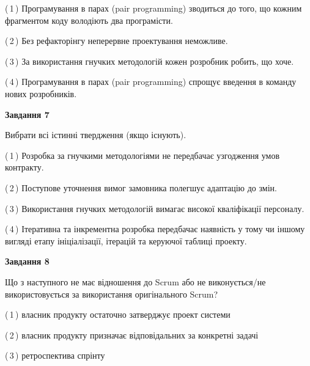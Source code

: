 \documentclass[10pt, ukrainian]{article}
\begin{document}
{\begin {large}
(\,1\,) Програмування в парах (pair programming) зводиться до того, що кожним фрагментом коду володіють два програмісти. %



(\,2\,) Без рефакторінгу неперервне проектування неможливе. %



(\,3\,) За використання гнучких методологій кожен розробник робить, що хоче. %



(\,4\,) Програмування в парах (pair programming) спрощує введення в команду нових розробників. %


{\begin {center}\textbf{Завдання 7}\end {center}}\par
Вибрати всі істинні твердження (якщо існують).\par
\vspace{2mm}



(\,1\,) Розробка за гнучкими методологіями не передбачає узгодження умов контракту. %



(\,2\,) Поступове уточнення вимог замовника полегшує адаптацію до змін. %



(\,3\,) Використання гнучких методологій вимагає високої кваліфікації персоналу. %



(\,4\,) Ітеративна та інкрементна розробка передбачає наявність у тому чи іншому вигляді етапу ініціалізації, ітерацій та керуючої таблиці проекту. %


{\begin {center}\textbf{Завдання 8}\end {center}}\par
Що з наступного не має відношення до Scrum або не виконується/не використовується за використання оригінального Scrum?\par
\vspace{2mm}



(\,1\,) власник продукту остаточно затверджує проект системи%



(\,2\,) власник продукту призначає відповідальних за конкретні задачі%



(\,3\,) ретроспектива спрінту%




\end{large}}
\end{document}
